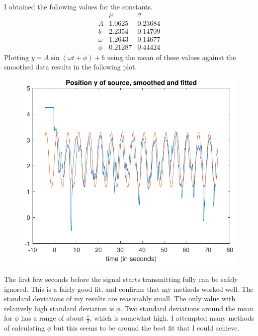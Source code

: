 \documentclass[12pt]{article}
\begin{document}
I obtained the following values for the constants.
\[\begin{array}{c|cc}
    & \mu & \sigma\\
    \hline
    A & 1.0625 & 0.23684\\
    b & 2.2354 & 0.14709\\
    \omega & 1.2643 & 0.14677\\
    \phi & 0.21287 & 0.44424
\end{array}\]
Plotting \(y=A\sin(\omega t + \phi) + b\) using the mean of these values against the smoothed data results
in the following plot.
\begin{figure}[H]
    \begin{center}
        \includegraphics[width=4.5in]{y-fitted.pdf}
    \end{center}
\end{figure}
The first few seconds before the signal starts transmitting fully can be safely ignored. This is a fairly
good fit, and confirms that my methods worked well. The standard deviations of my results are reasonably small.
The only value with relatively high standard deviation is \(\phi\). Two standard deviations around the mean for \(\phi\)
has a range of about \(\frac{\pi}{2}\), which is somewhat high. I attempted many methods of calculating \(\phi\)
but this seems to be around the best fit that I could achieve.



\end{document}

